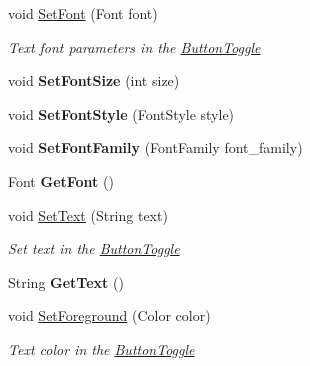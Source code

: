 \begin{DoxyCompactItemize}
void \mbox{\hyperlink{class_space_v_i_l_1_1_button_toggle_a5743b3faec33d35b9c0faed624af2fb7}{Set\+Font}} (Font font)
\begin{DoxyCompactList}\small\item\em Text font parameters in the \mbox{\hyperlink{class_space_v_i_l_1_1_button_toggle}{Button\+Toggle}} \end{DoxyCompactList}\item 
\mbox{\label{class_space_v_i_l_1_1_button_toggle_a841cf4443b2027767fd392ec9534d428}} 
void {\bfseries Set\+Font\+Size} (int size)
\item 
\mbox{\label{class_space_v_i_l_1_1_button_toggle_a8a5e11233b70f437fc6bcc8e863c965f}} 
void {\bfseries Set\+Font\+Style} (Font\+Style style)
\item 
\mbox{\label{class_space_v_i_l_1_1_button_toggle_a671adffc344bc578a568e98334ac5153}} 
void {\bfseries Set\+Font\+Family} (Font\+Family font\+\_\+family)
\item 
\mbox{\label{class_space_v_i_l_1_1_button_toggle_a088bf517586f2bce2340a392fb47794d}} 
Font {\bfseries Get\+Font} ()
\item 
void \mbox{\hyperlink{class_space_v_i_l_1_1_button_toggle_ac931c391826bc511674985903c87149b}{Set\+Text}} (String text)
\begin{DoxyCompactList}\small\item\em Set text in the \mbox{\hyperlink{class_space_v_i_l_1_1_button_toggle}{Button\+Toggle}} \end{DoxyCompactList}\item 
\mbox{\label{class_space_v_i_l_1_1_button_toggle_a239c313c61a182996ba3705fb173a01b}} 
String {\bfseries Get\+Text} ()
\item 
void \mbox{\hyperlink{class_space_v_i_l_1_1_button_toggle_adb9766dbc7e14c40d73c00e0bf1419ff}{Set\+Foreground}} (Color color)
\begin{DoxyCompactList}\small\item\em Text color in the \mbox{\hyperlink{class_space_v_i_l_1_1_button_toggle}{Button\+Toggle}} \end{DoxyCompactList}\item 

\end{DoxyCompactItemize}
